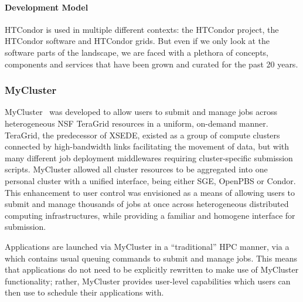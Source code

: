 \documentclass{sig-alternate}
\begin{document}
\paragraph{Development Model}

HTCondor is used in multiple different contexts: the HTCondor project,
the HTCondor software and HTCondor grids.
But even if we only look at the software parts of the landscape, we are faced
with a plethora of concepts, components and services that have been
grown and curated for the past 20 years.

%
%
\subsubsection{MyCluster}
\label{sec:mycluster}

MyCluster~\cite{1652061} was developed to allow users to submit and manage jobs
across heterogeneous NSF TeraGrid resources in a uniform, on-demand manner.
TeraGrid, the predecessor of XSEDE, existed as a group of compute clusters
connected by high-bandwidth links facilitating the movement of data, but with
many different job deployment middlewares requiring cluster-specific submission
scripts.
MyCluster allowed all cluster resources to be aggregated into one personal
cluster with a unified interface, being either SGE, OpenPBS or Condor.
This enhancement to user control was envisioned as a means of allowing users to
submit and manage thousands of jobs at once across heterogeneous distributed
computing infrastructures, while providing a familiar and homogene interface
for submission.

Applications are launched via MyCluster in a ``traditional'' HPC manner, via a
 which contains usual queuing commands to submit
and manage jobs.
This means that applications do not need to be explicitly rewritten to make use
of MyCluster functionality; rather, MyCluster provides user-level \pilot
capabilities which users can then use to schedule their applications with.
\end{document}

